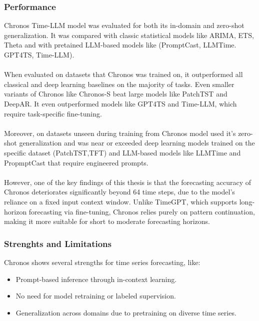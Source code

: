 \documentclass{article}
\begin{document}
\subsubsection{Performance}
Chronos Time-LLM model was evaluated for both its in-domain and zero-shot generalization. It was compared with classic statistical models like ARIMA, ETS, Theta and with pretained LLM-based models like (PromptCast, LLMTime. GPT4TS, Time-LLM).\\
\\
When evaluated on datasets that Chronos was trained on, it outperformed all classical and deep learning baselines on the majority of tasks. Even smaller variants of Chronos like Chronos-S beat large models like PatchTST and DeepAR. It even outperformed models like GPT4TS and Time-LLM, which require task-specific fine-tuning.\\
\\
Moreover, on datasets unseen during training from Chronos model used it's zero-shot generalization and was near or exceeded deep learning models trained on the specific dataset (PatchTST,TFT) and LLM-based models like LLMTime and PropmptCast that require engineered prompts.\\
\\
However, one of the key findings of this thesis is that the forecasting accuracy of Chronos deteriorates significantly beyond 64 time steps, due to the model’s reliance on a fixed input context window. Unlike TimeGPT, which supports long-horizon forecasting via fine-tuning, Chronos relies purely on pattern continuation, making it more suitable for short to moderate forecasting horizons.

\subsubsection{Strenghts and Limitations}
Chronos shows several strengths for time series forecasting, like:

\begin{itemize}
    \item Prompt-based inference through in-context learning.
\end{itemize}

\begin{itemize}
    \item No need for model retraining or labeled supervision.
\end{itemize}

\begin{itemize}
    \item Generalization across domains due to pretraining on diverse time series.
\end{itemize}
\end{document}
